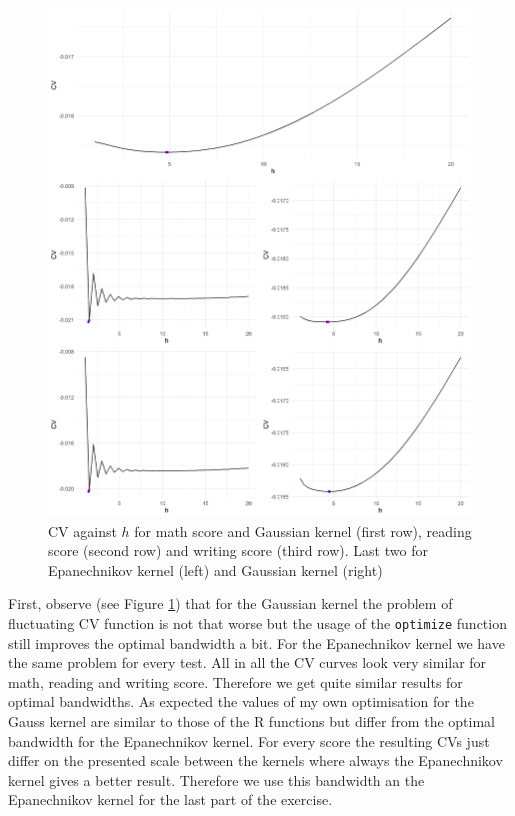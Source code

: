 \begin{figure}[p]
\centering
\includegraphics[width=\textwidth, keepaspectratio]{ex8/CVplots.png}
\caption{CV against $h$ for math score and Gaussian kernel (first row), reading score (second row) and writing score (third row). Last two for Epanechnikov  kernel (left) and Gaussian kernel (right)}
\label{6CVs}
\end{figure}

First, observe (see Figure \ref{6CVs}) that for the Gaussian kernel the problem of fluctuating CV function is not that worse but the usage of the \texttt{optimize} function still improves the optimal bandwidth a bit. For the Epanechnikov kernel we have the same problem for every test. All in all the CV curves look very similar for math, reading and writing score. Therefore we get quite similar results for optimal bandwidths. As expected the values of my own optimisation for the Gauss kernel are similar to those of the R functions but differ from the optimal bandwidth for the Epanechnikov kernel. For every score the resulting CVs just differ on the presented scale between the kernels where always the Epanechnikov kernel gives a better result. Therefore we use this bandwidth an the Epanechnikov kernel for the last part of the exercise. 

